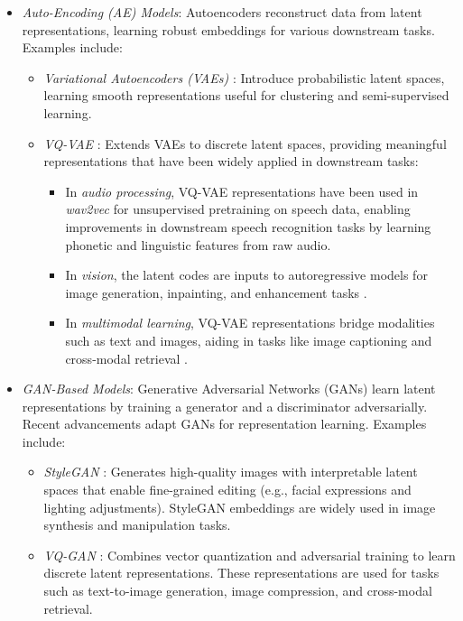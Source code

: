\begin{itemize}
    \item \emph{Auto-Encoding (AE) Models}: Autoencoders reconstruct data from latent representations, learning robust embeddings for various downstream tasks. Examples include:
    \begin{itemize}
        \item \emph{Variational Autoencoders (VAEs)} \citep{kingma2013auto}: Introduce probabilistic latent spaces, learning smooth representations useful for clustering and semi-supervised learning.
        \item \emph{VQ-VAE} \citep{oord2017neural}: Extends VAEs to discrete latent spaces, providing meaningful representations that have been widely applied in downstream tasks:
        \begin{itemize}
            \item In \textit{audio processing}, VQ-VAE representations have been used in \textit{wav2vec} \citep{baevski2020wav2vec} for unsupervised pretraining on speech data, enabling improvements in downstream speech recognition tasks by learning phonetic and linguistic features from raw audio.
            \item In \textit{vision}, the latent codes are inputs to autoregressive models for image generation, inpainting, and enhancement tasks \citep{razavi2019generating}.
            \item In \textit{multimodal learning}, VQ-VAE representations bridge modalities such as text and images, aiding in tasks like image captioning and cross-modal retrieval \citep{ding2021vqvae}.
        \end{itemize}
    \end{itemize}
    \item \emph{GAN-Based Models}: Generative Adversarial Networks (GANs) learn latent representations by training a generator and a discriminator adversarially. Recent advancements adapt GANs for representation learning. Examples include:
    \begin{itemize}
        \item \emph{StyleGAN} \citep{karras2019style}: Generates high-quality images with interpretable latent spaces that enable fine-grained editing (e.g., facial expressions and lighting adjustments). StyleGAN embeddings are widely used in image synthesis and manipulation tasks.
        \item \emph{VQ-GAN} \citep{esser2021taming}: Combines vector quantization and adversarial training to learn discrete latent representations. These representations are used for tasks such as text-to-image generation, image compression, and cross-modal retrieval.
    \end{itemize}
\end{itemize}

